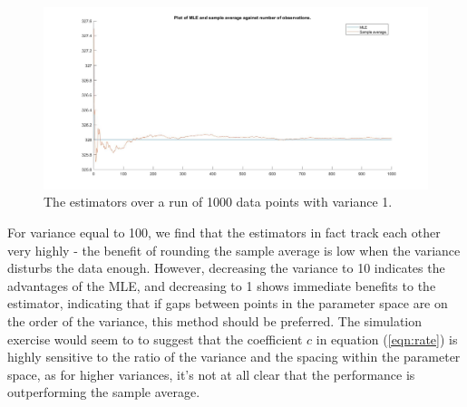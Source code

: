 \documentclass{article}
\begin{document}
\begin{center}
\begin{figure}
\centering
\includegraphics[width=13cm]{q10var1.jpg}
\caption{The estimators over a run of 1000 data points with variance 1.}
\label{fig:10v1}
\end{figure} 
\end{center}

For variance equal to 100, we find that the estimators in fact track each other very highly - the benefit of rounding the sample average is low when the variance disturbs the data enough. However, decreasing the variance to 10 indicates the advantages of the MLE, and decreasing to 1 shows immediate benefits to the estimator, indicating that if gaps between points in the parameter space are on the order of the variance, this method should be preferred. The simulation exercise would seem to to suggest that the coefficient $c$ in equation (\ref{eqn:rate}) is highly sensitive to the ratio of the variance and the spacing within the parameter space, as for higher variances, it's not at all clear that the performance is outperforming the sample average.





\clearpage


\end{document}
